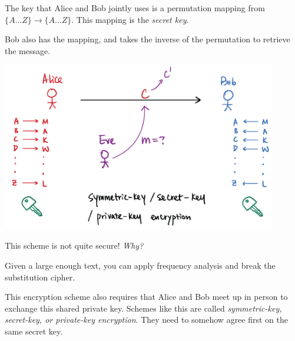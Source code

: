 \begin{example}
    The key that Alice and Bob jointly uses is a permutation mapping from $\{A\dots Z\}\to \{A\dots Z\}$. This mapping is the \emph{secret key}.

    Bob also has the mapping, and takes the inverse of the permutation to retrieve the message.

    \begin{center}
        \includegraphics[width=0.9\textwidth]{images/2023-01-26/substitution_cipher.png}
    \end{center}

    This scheme is not quite secure! \emph{Why?}

    Given a large enough text, you can apply frequency analysis and break the substitution cipher.
\end{example}
\begin{remark*}
    This encryption scheme also requires that Alice and Bob meet up in person to exchange this shared private key. Schemes like this are called \emph{symmetric-key, secret-key, or private-key encryption}. They need to somehow agree first on the same secret key.
\end{remark*}

